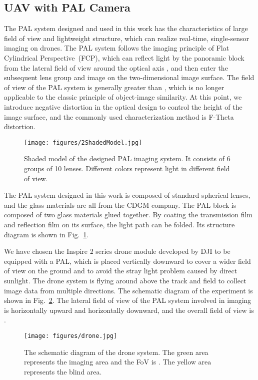 \documentclass[letterpaper, 10 pt, conference]{ieeeconf}
\begin{document}
\subsection{UAV with PAL Camera}

The PAL system designed and used in this work has the characteristics of large field of view and lightweight structure, which can realize real-time, single-sensor imaging on drones.
The PAL system follows the imaging principle of Flat Cylindrical Perspective~(FCP), which can reflect light by the panoramic block from the lateral field of view around the optical axis , and then enter the subsequent lens group and image on the two-dimensional image surface. The field of view of the PAL system is generally greater than , which is no longer applicable to the classic principle of object-image similarity. At this point, we introduce negative distortion in the optical design to control the height of the image surface, and the commonly used characterization method is F-Theta distortion.

\begin{figure}[!t]
    \centerline{\texttt{[image: figures/2ShadedModel.jpg]}}
    \caption{Shaded model of the designed PAL imaging system. It consists of 6 groups of 10 lenses. Different colors represent light in different field of view. }
    \label{fig:1}
\end{figure}

The PAL system designed in this work is composed of  standard spherical lenses, and the glass materials are all from the CDGM company.
The PAL block is composed of two glass materials glued together.
By coating the transmission film and reflection film on its surface, the light path can be folded. Its structure diagram is shown in Fig.~\ref{fig:1}. 

We have chosen the Inspire 2 series drone module developed by DJI to be equipped with a PAL, which is placed vertically downward to cover a wider field of view on the ground and to avoid the stray light problem caused by direct sunlight. The drone system is flying around  above the track and field to collect image data from multiple directions. The schematic diagram of the experiment is shown in Fig.~\ref{fig:2}. The lateral field of view of the PAL system involved in imaging is  horizontally upward and  horizontally downward, and the overall field of view is .

\begin{figure}[!t]
    \centerline{\texttt{[image: figures/drone.jpg]}}
    \caption{The schematic diagram of the drone system. The green area represents the imaging area and the FoV is . The yellow area represents the blind area.}
    \label{fig:2}
\end{figure}
\end{document}
